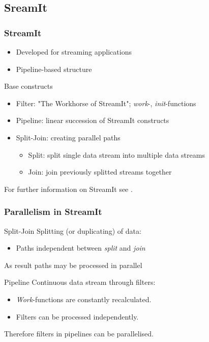 \documentclass{beamer}
\begin{document}
\subsection{SreamIt}
\begin{frame}
\frametitle{StreamIt}
	\begin{itemize}
		\item Developed for streaming applications
		\item Pipeline-based structure
	\end{itemize}
	\begin{block}{Base constructs}
		\begin{itemize}
			\item Filter: "The Workhorse of StreamIt"; \textit{work}-, \textit{init}-functions 
			\item Pipeline: linear succession of StreamIt constructs
			\item Split-Join: creating parallel paths
			\begin{itemize}
				\item Split: split single data stream into multiple data streams
				\item Join: join previously splitted streams together
			\end{itemize}
		\end{itemize}
	\end{block}
	For further information on StreamIt see \cite{streamIt}.
\end{frame}

\begin{frame}
\frametitle{Parallelism in StreamIt}
	\begin{block}{Split-Join}
		Splitting (or duplicating) of data:\\
		\begin{itemize}
			\item Paths independent between \textit{split} and \textit{join}
		\end{itemize}
		As result paths may be processed in parallel
	\end{block}
	\begin{block}{Pipeline}
		Continuous data stream through filters:\\
		\begin{itemize}
			\item \textit{Work}-functions are constantly recalculated.
			\item Filters can be processed independently.
		\end{itemize}
		Therefore filters in pipelines can be parallelised.
	\end{block}
\end{frame}
\end{document}
